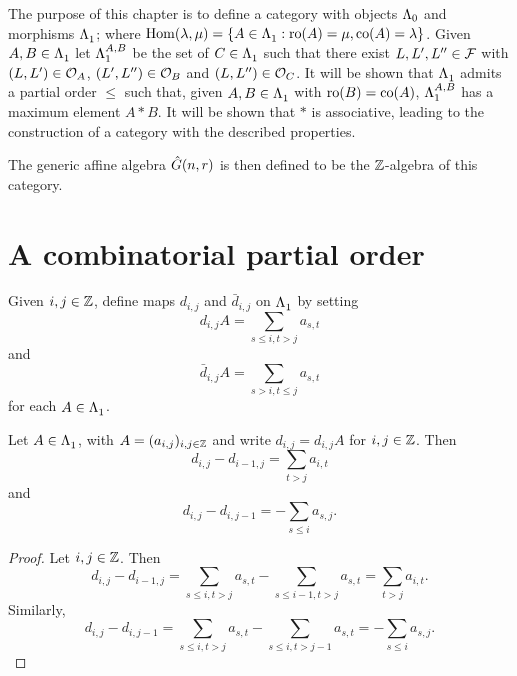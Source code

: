 \documentclass[a4paper, 11pt]{report}
\begin{document}
The purpose of this chapter is to define a category with objects $\compositions$ and morphisms $\matrices$; where $\HOM(\lambda,\mu) = \{A\in\matrices: \ro{A}=\mu,\co{A}=\lambda\}$. Given $A,B\in\matrices$ let $\matrices[A,B]$ be the set of $C\in\matrices$ such that there exist $L,L',L''\in\flags$ with $(L,L')\in\orbit{A}$, $(L',L'')\in\orbit{B}$ and $(L,L'')\in\orbit{C}$. It will be shown that $\matrices$ admits a partial order $\le$ such that, given $A,B\in\matrices$ with $\ro{B}=\co{A}$, $\matrices[A,B]$ has a maximum element $A\ast B$. It will be shown that $\ast$ is associative, leading to the construction of a category with the described properties.

The generic affine algebra $\generic$ is then defined to be the $\integers$-algebra of this category.

\section{A combinatorial partial order}

Given $i,j\in\integers$, define maps $d_{i,j}$ and $\bar{d}_{i,j}$ on $\matrices$ by setting
\begin{equation*}
d_{i,j}{A} = \sum_{s\le i,t>j} a_{s,t}
\end{equation*}
and
\begin{equation*}
\bar{d}_{i,j}{A} = \sum_{s>i, t\le j} a_{s,t}
\end{equation*}
for each $A\in\matrices$.

\begin{lemma}\label{lemma:differentials}
Let $A\in\matrices$, with $A=(a_{i,j})_{i,j\in\integers}$ and write $d_{i,j} = d_{i,j}A$ for $i,j\in\integers$. Then
\begin{equation*}
d_{i,j} - d_{i-1,j} = \sum_{t>j}a_{i,t}
\end{equation*}
and
\begin{equation*}
d_{i,j}-d_{i,j-1} = - \sum_{s\le i}a_{s,j}.
\end{equation*}
\end{lemma}

\begin{proof}
Let $i,j\in\integers$. Then
\begin{equation*}
d_{i,j} - d_{i-1,j} = \sum_{s\le i,t>j}a_{s,t} - \sum_{s\le i-1,t>j}a_{s,t} = \sum_{t>j}a_{i,t}.
\end{equation*}
Similarly,
\begin{equation*}
d_{i,j}-d_{i,j-1} = \sum_{s\le i,t>j}a_{s,t} - \sum_{s\le i,t>j-1}a_{s,t} = -\sum_{s\le i}a_{s,j}.
\end{equation*}
\end{proof}
\end{document}
